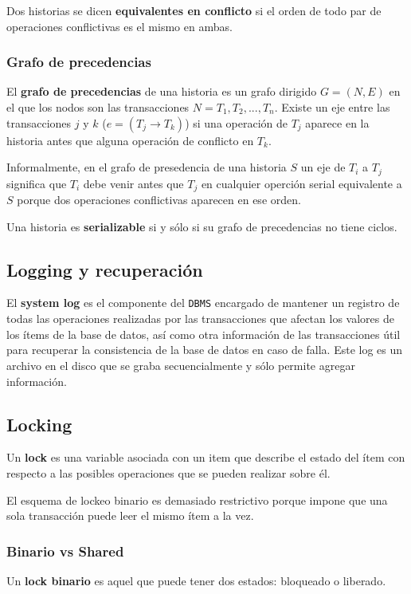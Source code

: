 \documentclass[]{article}
\begin{document}
Dos historias se dicen \textbf{equivalentes en conflicto} si el orden de todo par de operaciones conflictivas es el mismo en ambas.

\subsubsection{Grafo de precedencias}
El \textbf{grafo de precedencias} de una historia es un grafo dirigido $G=(N,E)$ en el que los nodos son las transacciones $N=T_1, T_2, ..., T_n$. Existe un eje entre las transacciones $j$ y $k$ ($e = (T_j \rightarrow T_k)$) si una operación de $T_j$ aparece en la historia antes que alguna operación de conflicto en $T_k$.

Informalmente, en el grafo de presedencia de una historia $S$ un eje de $T_i$ a $T_j$ significa que $T_i$ debe venir antes que $T_j$ en cualquier operción serial equivalente a $S$ porque dos operaciones conflictivas aparecen en ese orden.

Una historia es \textbf{serializable} si y sólo si su grafo de precedencias no tiene ciclos.


\subsection{Logging y recuperación}
El \textbf{system log} es el componente del \texttt{DBMS} encargado de mantener un registro de todas las operaciones realizadas por las transacciones que afectan los valores de los ítems de la base de datos, así como otra información de las transacciones útil para recuperar la consistencia de la base de datos en caso de falla. Este log es un archivo en el disco que se graba secuencialmente y sólo permite agregar información.


\subsection{Locking}
Un \textbf{lock} es una variable asociada con un item que describe el estado del ítem con respecto a las posibles operaciones que se pueden realizar sobre él.

El esquema de lockeo binario es demasiado restrictivo porque impone que una sola transacción puede leer el mismo ítem a la vez.

\subsubsection{Binario vs Shared}
Un \textbf{lock binario} es aquel que puede tener dos estados: bloqueado o liberado.
\end{document}

